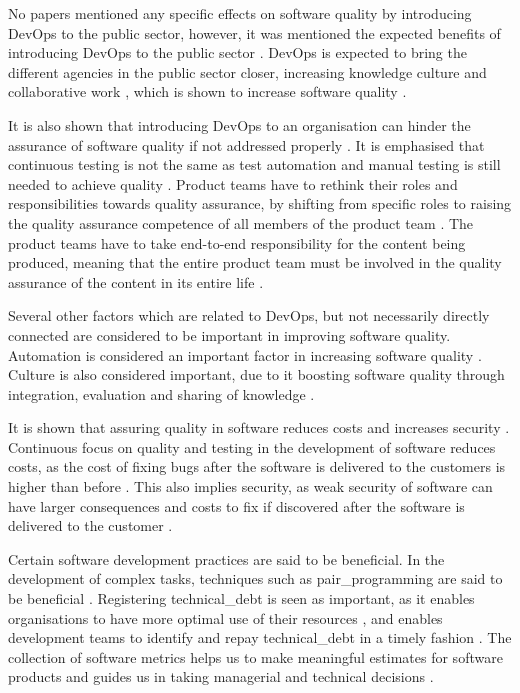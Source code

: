 No papers mentioned any specific effects on software quality by introducing DevOps to the public sector, however, it was mentioned the expected benefits of introducing DevOps to the public sector \cite{mm_2021}. DevOps is expected to bring the different agencies in the public sector closer, increasing knowledge culture and collaborative work \cite{mm_2021}, which is shown to increase software quality \cite{smm_2018}.

It is also shown that introducing DevOps to an organisation can hinder the assurance of software quality if not addressed properly \cite{dsc_2019}. It is emphasised that continuous testing is not the same as test automation and manual testing is still needed to achieve quality \cite{dsc_2019}. Product teams have to rethink their roles and responsibilities towards quality assurance, by shifting from specific roles to raising the quality assurance competence of all members of the product team \cite{dsc_2019}. The product teams have to take end-to-end responsibility for the content being produced, meaning that the entire product team must be involved in the quality assurance of the content in its entire life \cite{dsc_2019}. 

Several other factors which are related to DevOps, but not necessarily directly connected are considered to be important in improving software quality. Automation is considered an important factor in increasing software quality \cite{smm_2018}. Culture is also considered important, due to it boosting software quality through integration, evaluation and sharing of knowledge \cite{smm_2018}.

It is shown that assuring quality in software reduces costs and increases security \cite{csw_2011}. Continuous focus on quality and testing in the development of software reduces costs, as the cost of fixing bugs after the software is delivered to the customers is higher than before \cite{csw_2011}. This also implies security, as weak security of software can have larger consequences and costs to fix if discovered after the software is delivered to the customer \cite{csw_2011}. 

Certain software development practices are said to be beneficial. In the development of complex tasks, techniques such as \gls{pair_programming} are said to be beneficial \cite{jeh_2009}. Registering \gls{technical_debt} is seen as important, as it enables organisations to have more optimal use of their resources \cite{mv_2022}, and enables development teams to identify and repay \gls{technical_debt} in a timely fashion \cite{mv_2022}. The collection of software metrics helps us to make meaningful estimates for software products and guides us in taking managerial and technical decisions \cite{jkc_2010}.

